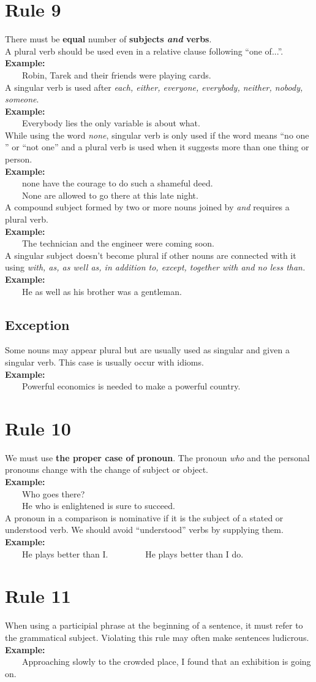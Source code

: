 \documentclass{report}
\newcommand{\xmpl}{\textbf{Example:}\\} %
\newcommand{\indnt}{\ \ \ \ } %
\begin{document}
\section{Rule 9}
There must be \textbf{equal} number of \textbf{subjects \emph{and} verbs}.\\ 
A plural verb should be used even in a relative clause following ``one of...''.\\
\xmpl
\indnt Robin, Tarek and their friends were playing cards.\\
A singular verb is used after \emph{each, either, everyone, everybody, neither, nobody, someone}.\\
\xmpl
\indnt Everybody lies the only variable is about what.\\
While using the word \emph{none}, singular verb is only used if the word means ``no one '' or ``not one'' and a plural verb is used when it suggests more than one thing or person.\\
\xmpl
\indnt none have the courage to do such a shameful deed.\\
\indnt None are allowed to go there at this late night.\\
A compound subject formed by two or more nouns joined by \emph{and} requires a plural verb.\\
\xmpl
\indnt The technician and the engineer were coming soon.\\
A singular subject doesn't become plural if other nouns are connected with it using \emph{with, as, as well as, in addition to, except, together with \emph{and} no less than.}\\
\xmpl
\indnt He as well as his brother was a gentleman.\\
\subsection{Exception}
Some nouns may appear plural but are usually used as singular and given a singular verb. This case is usually occur with idioms.\\
\textbf{Example:}\\
\indnt Powerful economics is needed to make a powerful country.

\section{Rule 10}
We must use \textbf{the proper case of pronoun}. The pronoun \textit{who} and the personal pronouns change with the change of subject or object.\\
\xmpl
\indnt Who goes there?\\
\indnt He who is enlightened is sure to succeed.\\
A pronoun in a comparison is nominative if it is the subject of a stated or understood verb. We should avoid ``understood'' verbs by supplying them.
\xmpl
\indnt He plays better than I. \indnt \indnt He plays better than I do.

\section{Rule 11}\label{rl11}
When using a participial phrase at the beginning of a sentence, it must refer to the grammatical subject. Violating this rule may often make sentences ludicrous.\\
\xmpl
\indnt Approaching slowly to the crowded place, I found that an exhibition is going on.
\end{document}
